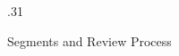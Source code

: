 \documentclass[final,hyperref={pdfpagelabels=false}]{beamer}
\begin{document}
\begin{frame}[fragile]{}
\begin{columns}[t]
\begin{column}{.31\linewidth}
\begin{block}{Segments and Review Process}

\end{block}
      \end{column}
      

\end{columns}
\end{frame}
\end{document}
